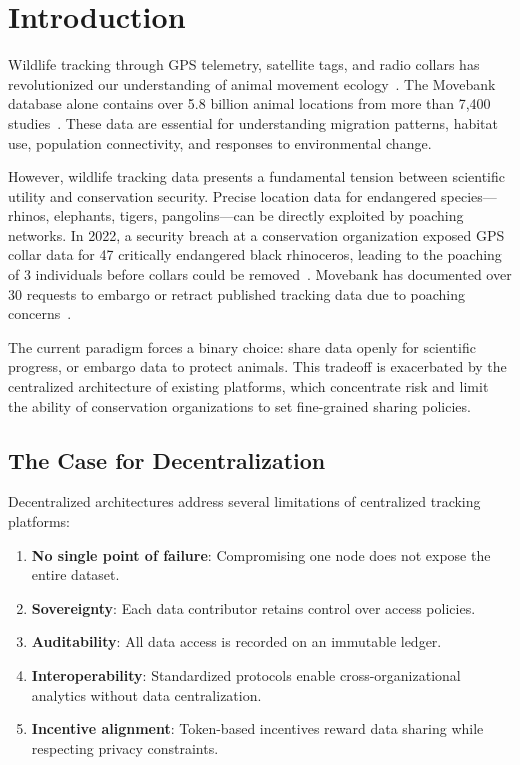 \section{Introduction}


Wildlife tracking through GPS telemetry, satellite tags, and radio collars has revolutionized our understanding of animal movement ecology~\cite{kays2015}. The Movebank database alone contains over 5.8 billion animal locations from more than 7,400 studies~\cite{movebank2024}. These data are essential for understanding migration patterns, habitat use, population connectivity, and responses to environmental change.

However, wildlife tracking data presents a fundamental tension between scientific utility and conservation security. Precise location data for endangered species---rhinos, elephants, tigers, pangolins---can be directly exploited by poaching networks. In 2022, a security breach at a conservation organization exposed GPS collar data for 47 critically endangered black rhinoceros, leading to the poaching of 3 individuals before collars could be removed~\cite{wri2023}. Movebank has documented over 30 requests to embargo or retract published tracking data due to poaching concerns~\cite{hebblewhite2022}.

The current paradigm forces a binary choice: share data openly for scientific progress, or embargo data to protect animals. This tradeoff is exacerbated by the centralized architecture of existing platforms, which concentrate risk and limit the ability of conservation organizations to set fine-grained sharing policies.

\subsection{The Case for Decentralization}

Decentralized architectures address several limitations of centralized tracking platforms:

\begin{enumerate}[leftmargin=*]
    \item \textbf{No single point of failure}: Compromising one node does not expose the entire dataset.
    \item \textbf{Sovereignty}: Each data contributor retains control over access policies.
    \item \textbf{Auditability}: All data access is recorded on an immutable ledger.
    \item \textbf{Interoperability}: Standardized protocols enable cross-organizational analytics without data centralization.
    \item \textbf{Incentive alignment}: Token-based incentives reward data sharing while respecting privacy constraints.
\end{enumerate}

